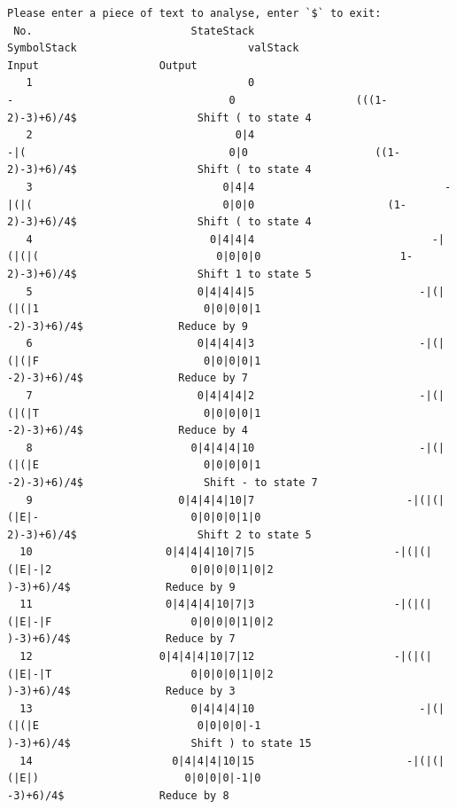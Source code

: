 \documentclass[UTF8]{ctexart}
\begin{document}
\begin{lstlisting}
Please enter a piece of text to analyse, enter `$` to exit:
 No.                         StateStack                        SymbolStack                           valStack                              Input                   Output
   1                                  0                                  -                                  0                   (((1-2)-3)+6)/4$                   Shift ( to state 4
   2                                0|4                                -|(                                0|0                    ((1-2)-3)+6)/4$                   Shift ( to state 4
   3                              0|4|4                              -|(|(                              0|0|0                     (1-2)-3)+6)/4$                   Shift ( to state 4
   4                            0|4|4|4                            -|(|(|(                            0|0|0|0                      1-2)-3)+6)/4$                   Shift 1 to state 5
   5                          0|4|4|4|5                          -|(|(|(|1                          0|0|0|0|1                       -2)-3)+6)/4$               Reduce by 9
   6                          0|4|4|4|3                          -|(|(|(|F                          0|0|0|0|1                       -2)-3)+6)/4$               Reduce by 7
   7                          0|4|4|4|2                          -|(|(|(|T                          0|0|0|0|1                       -2)-3)+6)/4$               Reduce by 4
   8                         0|4|4|4|10                          -|(|(|(|E                          0|0|0|0|1                       -2)-3)+6)/4$                   Shift - to state 7
   9                       0|4|4|4|10|7                        -|(|(|(|E|-                        0|0|0|0|1|0                        2)-3)+6)/4$                   Shift 2 to state 5
  10                     0|4|4|4|10|7|5                      -|(|(|(|E|-|2                      0|0|0|0|1|0|2                         )-3)+6)/4$               Reduce by 9
  11                     0|4|4|4|10|7|3                      -|(|(|(|E|-|F                      0|0|0|0|1|0|2                         )-3)+6)/4$               Reduce by 7
  12                    0|4|4|4|10|7|12                      -|(|(|(|E|-|T                      0|0|0|0|1|0|2                         )-3)+6)/4$               Reduce by 3
  13                         0|4|4|4|10                          -|(|(|(|E                         0|0|0|0|-1                         )-3)+6)/4$                   Shift ) to state 15
  14                      0|4|4|4|10|15                        -|(|(|(|E|)                       0|0|0|0|-1|0                          -3)+6)/4$               Reduce by 8

\end{lstlisting}
\end{document}
